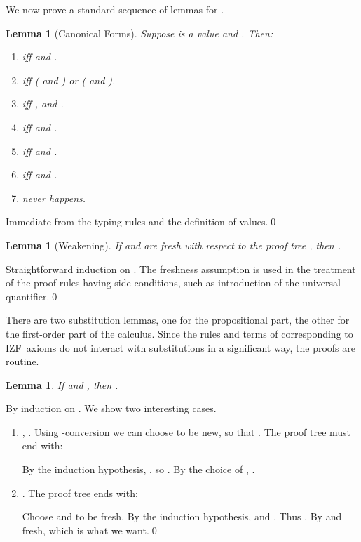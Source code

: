\documentclass{LMCS}
\newtheorem{lemma}[thm]{Lemma}
\newcommand{\izfr}{IZF}
\begin{document}
We now prove a standard sequence of lemmas for . 

\begin{lemma}[Canonical Forms]
Suppose  is a value and . Then: 
\begin{enumerate}[]
\item  iff  and .
\item  iff  ( and ) or ( and ).
\item  iff ,  and . 
\item  iff  and . 
\item  iff  and .
\item  iff  and .
\item  never happens.
\end{enumerate}
\end{lemma}
\proof Immediate from the typing rules and the definition of values.\qed


\begin{lemma}[Weakening]
If  and  are fresh with respect to the proof tree , then .
\end{lemma}
\proof Straightforward induction on . The freshness assumption is
used in the treatment of the proof rules having side-conditions, such as 
introduction of the universal quantifier.\qed


There are two substitution lemmas, one for the propositional part, the other
for the first-order part of the calculus. Since the rules and terms of 
corresponding to \izfr\ axioms do not interact with substitutions in a
significant way, the proofs are routine. 

\begin{lemma}\label{lamsl}
If  and  , then
.
\end{lemma}
\proof By induction on . We show two interesting cases.
\begin{enumerate}[]
\item , . Using -conversion 
we can choose  to be new, so that . The
proof tree must end with:

By the induction hypothesis, , so . By the choice of , . 
\item . The proof tree ends with:

Choose  and  to be fresh. By the induction hypothesis,  and . Thus . By  and  fresh,  which is what we want.\qed 
\end{enumerate}
\end{document}
